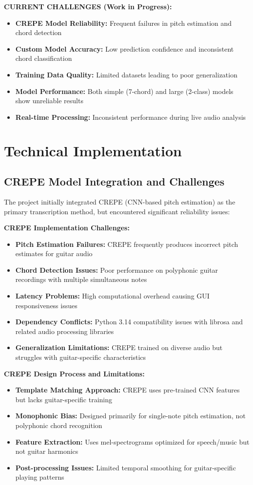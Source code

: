 \documentclass[11pt]{article}
\begin{document}
\textbf{CURRENT CHALLENGES (Work in Progress):}
\begin{itemize}[leftmargin=*,itemsep=2pt]
  \item \textbf{CREPE Model Reliability:} Frequent failures in pitch estimation and chord detection
  \item \textbf{Custom Model Accuracy:} Low prediction confidence and inconsistent chord classification
  \item \textbf{Training Data Quality:} Limited datasets leading to poor generalization
  \item \textbf{Model Performance:} Both simple (7-chord) and large (2-class) models show unreliable results
  \item \textbf{Real-time Processing:} Inconsistent performance during live audio analysis
\end{itemize}

\section*{Technical Implementation}

\subsection*{CREPE Model Integration and Challenges}
The project initially integrated CREPE (CNN-based pitch estimation) as the primary transcription method, but encountered significant reliability issues:

\textbf{CREPE Implementation Challenges:}
\begin{itemize}[leftmargin=*,itemsep=2pt]
  \item \textbf{Pitch Estimation Failures:} CREPE frequently produces incorrect pitch estimates for guitar audio
  \item \textbf{Chord Detection Issues:} Poor performance on polyphonic guitar recordings with multiple simultaneous notes
  \item \textbf{Latency Problems:} High computational overhead causing GUI responsiveness issues
  \item \textbf{Dependency Conflicts:} Python 3.14 compatibility issues with librosa and related audio processing libraries
  \item \textbf{Generalization Limitations:} CREPE trained on diverse audio but struggles with guitar-specific characteristics
\end{itemize}

\textbf{CREPE Design Process and Limitations:}
\begin{itemize}[leftmargin=*,itemsep=2pt]
  \item \textbf{Template Matching Approach:} CREPE uses pre-trained CNN features but lacks guitar-specific training
  \item \textbf{Monophonic Bias:} Designed primarily for single-note pitch estimation, not polyphonic chord recognition
  \item \textbf{Feature Extraction:} Uses mel-spectrograms optimized for speech/music but not guitar harmonics
  \item \textbf{Post-processing Issues:} Limited temporal smoothing for guitar-specific playing patterns
\end{itemize}
\end{document}
